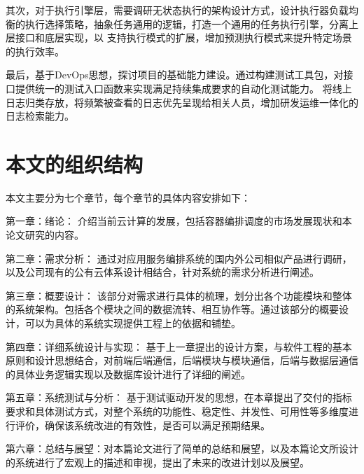 其次，对于执行引擎层，需要调研无状态执行的架构设计方式，设计执行器负载均衡的执行选择策略，抽象任务通用的逻辑，打造一个通用的任务执行引擎，分离上层接口和底层实现，以
支持执行模式的扩展，增加预测执行模式来提升特定场景的执行效率。

最后，基于DevOps思想，探讨项目的基础能力建设。通过构建测试工具包，对接口提供统一的测试入口函数来实现满足持续集成要求的自动化测试能力。
将线上日志归类存放，将频繁被查看的日志优先呈现给相关人员，增加研发运维一体化的日志检索能力。

\section{本文的组织结构}
本文主要分为七个章节，每个章节的具体内容安排如下：

第一章：绪论： 介绍当前云计算的发展，包括容器编排调度的市场发展现状和本论文研究的内容。

第二章：需求分析： 通过对应用服务编排系统的国内外公司相似产品进行调研，以及公司现有的公有云体系设计相结合，针对系统的需求分析进行阐述。

第三章：概要设计： 该部分对需求进行具体的梳理，划分出各个功能模块和整体的系统架构。包括各个模块之间的数据流转、相互协作等。通过该部分的概要设计，可以为具体的系统实现提供工程上的依据和铺垫。

第四章：详细系统设计与实现： 基于上一章提出的设计方案，与软件工程的基本原则和设计思想结合，对前端后端通信，后端模块与模块通信，后端与数据层通信的具体业务逻辑实现以及数据库设计进行了详细的阐述。

第五章：系统测试与分析： 基于测试驱动开发的思想，在本章提出了交付的指标要求和具体测试方式，对整个系统的功能性、稳定性、并发性、可用性等多维度进行评价，确保该系统改进的有效性，是否可以满足预期结果。

第六章：总结与展望：对本篇论文进行了简单的总结和展望，以及本篇论文所设计的系统进行了宏观上的描述和审视，提出了未来的改进计划以及展望。
